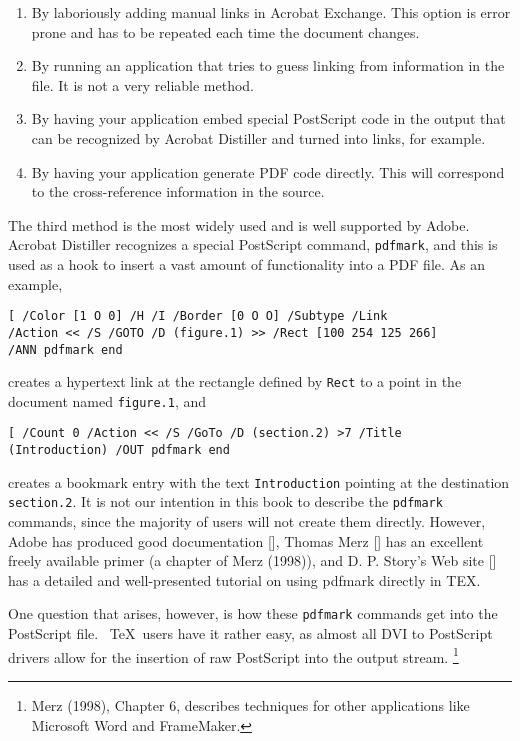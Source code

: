 \begin{enumerate}
  \item  By laboriously adding manual links in Acrobat Exchange. This option is error 
    prone and has to be repeated each time the document changes. 
  \item  By running an application that tries to guess linking from information in the 
    file. It is not a very reliable method. 
  \item  By having your application embed special PostScript code in the output that 
    can be recognized by Acrobat Distiller and turned into links, for example. 
  \item  By having your application generate PDF code directly. This will correspond 
    to the cross-reference information in the source. 
\end{enumerate}

The third method is the most widely used and is well supported by Adobe. 
Acrobat Distiller recognizes a special PostScript command, \verb|pdfmark|, and this is 
used as a hook to insert a vast amount of functionality into a PDF file. As an example, 

\begin{verbatim}
[ /Color [1 O 0] /H /I /Border [0 O O] /Subtype /Link 
/Action << /S /GOTO /D (figure.1) >> /Rect [100 254 125 266] 
/ANN pdfmark end 
\end{verbatim}

creates a hypertext link at the rectangle defined by \verb|Rect| to a point in the document 
named \verb|figure.1|, and 

\begin{verbatim}
[ /Count 0 /Action << /S /GoTo /D (section.2) >7 /Title 
(Introduction) /OUT pdfmark end 
\end{verbatim}

creates a bookmark entry with the text \verb|Introduction| pointing at
the destination \verb|section.2|. It is not our intention in this book
to describe the \verb|pdfmark| commands, since the majority of users
will not create them directly. However, Adobe has produced good
documentation [], Thomas Merz [] has an excellent freely available
primer (a chapter of Merz (1998)), and D. P. Story's Web site [] has a
detailed and well-presented tutorial on using pdfmark directly in TEX. 

One question that arises, however, is how these \verb|pdfmark| commands get into 
the PostScript file. \ \TeX\  users have it rather easy, as almost all DVI to PostScript 
drivers allow for the insertion of raw PostScript into the output stream.
\footnote{ Merz (1998), Chapter 6, describes techniques for other applications like Microsoft Word and 
FrameMaker.}


